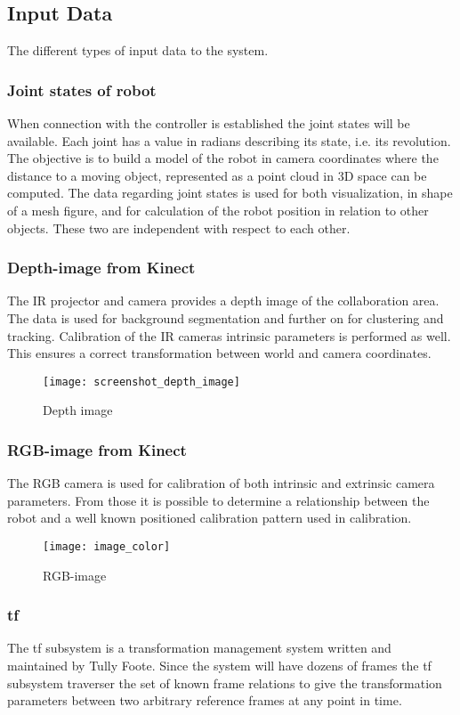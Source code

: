 \subsection{Input Data}
The different types of input data to the system.
\subsubsection{Joint states of robot}
When connection with the controller is established the joint states will be available. Each joint has a value in radians describing its state, i.e. its revolution. The objective is to build a model of the robot in camera coordinates where the distance to a moving object, represented as a point cloud in 3D space can be computed.
The data regarding joint states is used for both visualization, in shape of a mesh figure, and for calculation of the robot position in relation to other objects. These two are independent with respect to each other.

\subsubsection{Depth-image from Kinect}
The IR projector and camera provides a depth image of the collaboration area. The data is used for background segmentation and further on for clustering and tracking. Calibration of the IR cameras intrinsic parameters is performed as well. This ensures a correct transformation between world and camera coordinates.

\begin{figure}[H]
\begin{center}
\texttt{[image: screenshot\_depth\_image]}
\caption{Depth image}
\label{tracking}
\end{center}
\end{figure}

\subsubsection{RGB-image from Kinect}
The RGB camera is used for calibration of both intrinsic and extrinsic camera parameters. From those it is possible to determine a relationship between the robot and a well known positioned calibration pattern used in calibration. 

\begin{figure}[H]
\begin{center}
\texttt{[image: image\_color]}
\caption{RGB-image}
\label{tracking}
\end{center}
\end{figure}

\subsubsection{tf}
The tf subsystem is a transformation management system written and maintained by Tully Foote. Since the system will have dozens of frames the tf subsystem traverser the set of known frame relations to give the transformation parameters between two arbitrary reference frames at any point in time. 